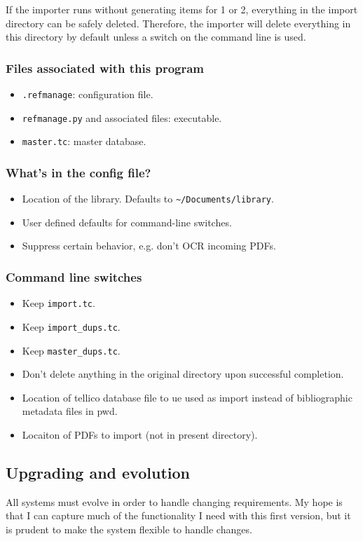 \documentclass[letterpaper,12pt]{article}
\begin{document}
If the importer runs without generating items for 1 or 2, everything in the import directory can be safely deleted. Therefore, the importer will delete everything in this directory by default unless a switch on the command line is used.

\subsubsection{Files associated with this program}
\begin{itemize}
\item \verb|.refmanage|: configuration file.
\item \verb|refmanage.py| and associated files: executable.
\item \verb|master.tc|: master database.
\end{itemize}

\subsubsection{What's in the config file?}
\begin{itemize}
\item Location of the library. Defaults to \verb|~/Documents/library|.
\item User defined defaults for command-line switches.
\item Suppress certain behavior, e.g. don't OCR incoming PDFs.
\end{itemize}

\subsubsection{Command line switches}
\begin{itemize}
\item Keep \verb|import.tc|.
\item Keep \verb|import_dups.tc|.
\item Keep \verb|master_dups.tc|.
\item Don't delete anything in the original directory upon successful completion.
\item Location of tellico database file to ue used as import instead of bibliographic metadata files in pwd.
\item Locaiton of PDFs to import (not in present directory).
\end{itemize}

\subsection{Upgrading and evolution}
All systems must evolve in order to handle changing requirements. My hope is that I can capture much of the functionality I need with this first version, but it is prudent to make the system flexible to handle changes.
\end{document}
